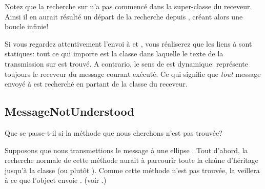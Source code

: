\documentclass[a4paper,10pt,twoside]{book}
\begin{document}
Notez que la recherche sur \super n'a pas commenc\'e dans la 
super-classe du receveur. Ainsi il en aurait r\'esult\'e
un d\'epart de la recherche depuis , 
cr\'eant alors une boucle infinie!


Si vous regardez attentivement l'envoi \`a \super et , vous r\'ealiserez que les liens \`a \super sont statiques: tout ce qui importe
est la classe dans laquelle le texte de la transmission sur \super est trouv\'e.
A contrario, le sens de \self est dynamique: \self repr\'esente toujours le
receveur du message courant ex\'ecut\'e. Ce qui signifie que  \emph{tout} message envoy\'e \`a \self est recherch\'e en partant de la classe du receveur.

\subsection{MessageNotUnderstood}

Que se passe-t-il si la m\'ethode que nous cherchons n'est pas trouv\'ee?

Supposons que nous transmettions le message  \`a une ellipse .
Tout d'abord, la recherche normale de cette m\'ethode aurait \`a parcourir
toute la cha\^{\i}ne d'h\'eritage jusqu'\`a la classe  (ou
plut\^ot ).
Comme cette m\'ethode n'est pas trouv\'ee, la  veillera
\`a ce que l'object envoie .
(voir .)
\end{document}

